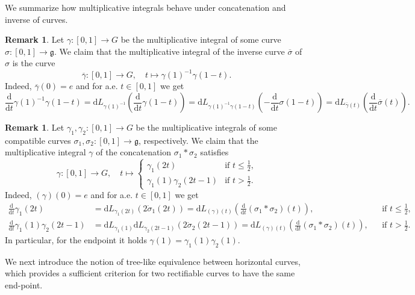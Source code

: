 \documentclass[a4paper,11pt,reqno]{amsart}
\theoremstyle{plain}
\theoremstyle{definition}
\newtheorem{remark}[theorem]{Remark}
\newcommand{\g}{\mathfrak{g}}
\newcommand{\id}{e}
\newcommand{\de}{\mathrm{d}}
\newcommand{\ddt}{\frac{\de}{\de t}}
\begin{document}
We summarize how multiplicative integrals behave under concatenation and inverse of curves.

\begin{remark} \label{rem:path}
 Let $\gamma \colon [0,1] \to G$ be the multiplicative integral of some curve $\sigma \colon [0,1] \to \g$. We claim that the multiplicative integral of the inverse curve $\overline{\sigma}$ of $\sigma$ is the curve 
\begin{equation*}
    \overline{\gamma} \colon [0,1] \to G, \quad t \mapsto \gamma(1)^{-1}\gamma(1-t).
\end{equation*}
Indeed, $\overline{\gamma}(0) = \id$ and for a.e. $t \in [0,1]$ we get
\[
\ddt \gamma(1)^{-1}\gamma(1-t) = \de L_{\gamma(1)^{-1}}\left(\ddt \gamma(1-t) \right) = \de L_{\gamma(1)^{-1}\gamma(1-t)} \left(-\ddt \sigma(1-t) \right) = \de L_{\overline{\gamma}(t)} \left(\ddt \overline{\sigma}(t)\right).
\]
\end{remark}

\begin{remark} \label{rem:path2}
Let $\gamma_1, \gamma_2 \colon [0,1] \to G$ be the multiplicative integrals of some compatible curves $\sigma_1, \sigma_2 \colon [0,1] \to \g$, respectively. We claim that the multiplicative integral $\gamma$ of the concatenation $\sigma_1 * \sigma_2$ satisfies 
\begin{equation*}
    \gamma\colon [0,1] \to G, \quad t \mapsto \begin{cases}
       \gamma_1(2t)  & \text{if $t \le \tfrac{1}{2}$,} \\ \gamma_1(1)\gamma_2(2t-1) &\text{if $t > \tfrac{1}{2}$.} \end{cases}
\end{equation*}
Indeed, $(\gamma)(0) = \id$ and for a.e. $t \in [0,1]$ we get
\begin{align*}
    \ddt \gamma_1(2t) &= \de L_{\gamma_1(2t)}(2\dot{\sigma}_1(2t))= \de L_{(\gamma)(t)}\left(\ddt (\sigma_1*\sigma_2)(t)\right), & &\text{if $t \le \tfrac{1}{2}$,} \\
        \ddt \gamma_1(1)\gamma_2(2t-1) &= \de L_{\gamma_1(1)} \de L_{\gamma_2(2t-1)}(2\dot{\sigma}_2(2t-1)) = \de L_{(\gamma)(t)}\left(\ddt (\sigma_1*\sigma_2)(t)\right), & &\text{if $t > \tfrac{1}{2}$.} 
\end{align*}
In particular, for the endpoint it holds $\gamma(1)=\gamma_1(1)\gamma_2(1)$.
\end{remark}

We next introduce the notion of tree-like equivalence between horizontal curves, which provides a sufficient criterion for two rectifiable curves to have the same end-point.
\end{document}
